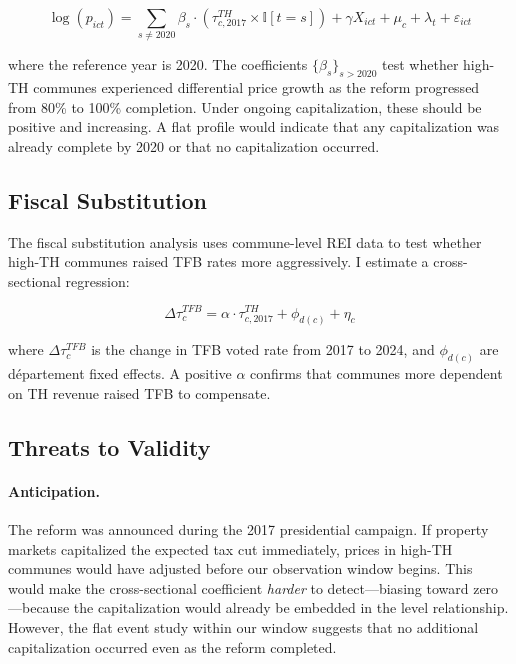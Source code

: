 \documentclass[12pt]{article}
\newcommand{\ind}{\mathbb{I}}
\begin{document}
\begin{equation}
    \log(p_{ict}) = \sum_{s \neq 2020} \beta_s \cdot (\tau^{TH}_{c,2017} \times \ind[t = s]) + \gamma X_{ict} + \mu_c + \lambda_t + \varepsilon_{ict}
    \label{eq:event}
\end{equation}

where the reference year is 2020. The coefficients $\{\beta_s\}_{s > 2020}$ test whether high-TH communes experienced differential price growth as the reform progressed from 80\% to 100\% completion. Under ongoing capitalization, these should be positive and increasing. A flat profile would indicate that any capitalization was already complete by 2020 or that no capitalization occurred.

\subsection{Fiscal Substitution}

The fiscal substitution analysis uses commune-level REI data to test whether high-TH communes raised TFB rates more aggressively. I estimate a cross-sectional regression:

\begin{equation}
    \Delta \tau^{TFB}_{c} = \alpha \cdot \tau^{TH}_{c,2017} + \phi_{d(c)} + \eta_c
\end{equation}

where $\Delta \tau^{TFB}_{c}$ is the change in TFB voted rate from 2017 to 2024, and $\phi_{d(c)}$ are d\'epartement fixed effects. A positive $\alpha$ confirms that communes more dependent on TH revenue raised TFB to compensate.

\subsection{Threats to Validity}

\paragraph{Anticipation.} The reform was announced during the 2017 presidential campaign. If property markets capitalized the expected tax cut immediately, prices in high-TH communes would have adjusted before our observation window begins. This would make the cross-sectional coefficient \emph{harder} to detect---biasing toward zero---because the capitalization would already be embedded in the level relationship. However, the flat event study within our window suggests that no additional capitalization occurred even as the reform completed.
\end{document}

